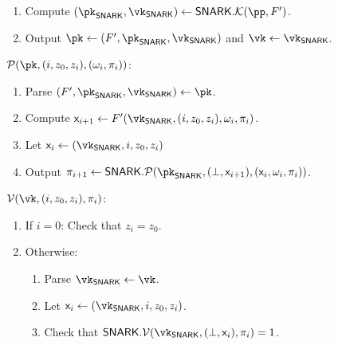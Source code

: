 \begin{construction}
\begin{mdframed}[nobreak=true]
\begin{enumerate}
      \item Compute 
      $(\pk_\snark, \vk_\snark) \gets \snark.\En(\pp, \FP)$.
      \item Output $\pk \gets (\FP, \pk_\snark, \vk_\snark)$ and $\vk \gets \vk_\snark$.
    \end{enumerate}
  \end{mdframed}
  \begin{mdframed}[nobreak=true]
    \underline{$\Po(\pk, (i, z_0, z_i), (\omega_i, \pi_i))$}:
    \begin{enumerate} 
      \item Parse $(\FP, \pk_\snark, \vk_\snark) \gets \pk$.
      \item Compute
      $\io_{i + 1} \gets \FP(\vk_{\snark},
      (i, z_0, z_i), \omega_i, \pi_i)$.
      \item Let $\io_i \gets (\vk_{\snark}, i, z_0, z_i)$
      \label{ivc:prover:io}
      \item Output
      $
      \pi_{i + 1} \gets \snark.\Po(\pk_\snark, (\bot, \io_{i + 1}), (\io_i
      , \omega_i, \pi_i))
      $.
      \label{ivc:prover:proof}
    \end{enumerate} 
  \end{mdframed}
  \begin{mdframed}[nobreak=true]
    \underline{$\V(\vk, (i, z_0, z_i), \pi_i)$}:
    \begin{enumerate}
      \item If $i = 0$: Check that $z_i = z_0$.
      \label{ivc:verifier:base}
      \item Otherwise:
      \begin{enumerate}
        \item Parse $\vk_{\snark} \gets \vk$.
        \item Let $\io_i \gets (\vk_\snark, i, z_0, z_i)$.
        \label{ivc:v:check:first}
        \item Check that
        $\snark.\V(\vk_\snark, (\bot, \io_i), \pi_i) = 1$.
        \label{ivc:v:check:second}
      \end{enumerate}
      
    \end{enumerate}
  \end{mdframed}
\end{construction}